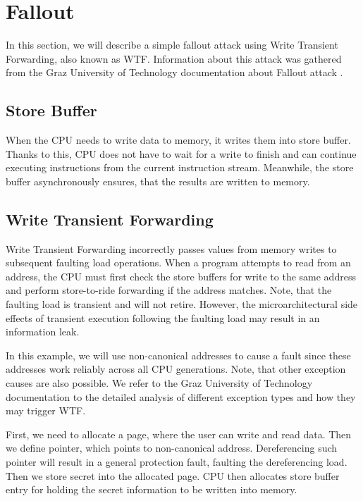 \documentclass[11pt,a4paper,titlepage]{article}
\begin{document}
    \section{Fallout} \label{fallout}
        In this section, we will describe a simple fallout attack using Write Transient Forwarding, also known as WTF. Information about this attack was gathered from the Graz University of Technology documentation about Fallout attack \cite{web:falloutdocumentation}.
    
        \subsection{Store Buffer}
            When the CPU needs to write data to memory, it writes them into store buffer. Thanks to this, CPU does not have to wait for a write to finish and can continue executing instructions from the current instruction stream. Meanwhile, the store buffer asynchronously ensures, that the results are written to memory.
            
        \subsection{Write Transient Forwarding}
            Write Transient Forwarding incorrectly passes values from memory writes to subsequent faulting load operations. When a program attempts to read from an address, the CPU must first check the store buffers for write to the same address and perform store-to-ride forwarding if the address matches. Note, that the faulting load is transient and will not retire. However, the microarchitectural side effects of transient execution following the faulting load may result in an information leak.
        
            In this example, we will use non-canonical addresses to cause a fault since these addresses work reliably across all CPU generations. Note, that other exception causes are also possible. We refer to the Graz University of Technology documentation \cite{web:falloutdocumentation} to the detailed analysis of different exception types and how they may trigger WTF.
        
            First, we need to allocate a page, where the user can write and read data. Then we define pointer, which points to non-canonical address. Dereferencing such pointer will result in a general protection fault, faulting the dereferencing load. Then we store secret into the allocated page. CPU then allocates store buffer entry for holding the secret information to be written into memory.
            
\end{document}
